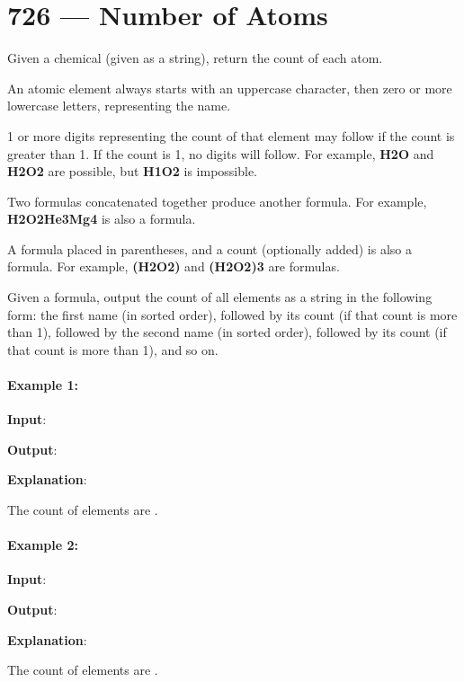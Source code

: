 \section{726 --- Number of Atoms}
Given a chemical  (given as a string), return the count of each atom.

An atomic element always starts with an uppercase character, then zero or more lowercase letters, representing the name.

1 or more digits representing the count of that element may follow if the count is greater than 1. If the count is 1, no digits will follow. For example, \textbf{H2O} and \textbf{H2O2} are possible, but \textbf{H1O2} is impossible.

Two formulas concatenated together produce another formula. For example, \textbf{H2O2He3Mg4} is also a formula.

A formula placed in parentheses, and a count (optionally added) is also a formula. For example, \textbf{(H2O2)} and \textbf{(H2O2)3} are formulas.

Given a formula, output the count of all elements as a string in the following form: the first name (in sorted order), followed by its count (if that count is more than 1), followed by the second name (in sorted order), followed by its count (if that count is more than 1), and so on.

\paragraph{Example 1:}

\begin{flushleft}
\textbf{Input}: 

\textbf{Output}: 

\textbf{Explanation}: 

The count of elements are \fcj{['H': 2, 'O': 1]}.
\end{flushleft}

\paragraph{Example 2:}

\begin{flushleft}

\textbf{Input}: 

\textbf{Output}: 

\textbf{Explanation}: 

The count of elements are \fcj{['H': 2, 'Mg': 1, 'O': 2]}.
\end{flushleft}

